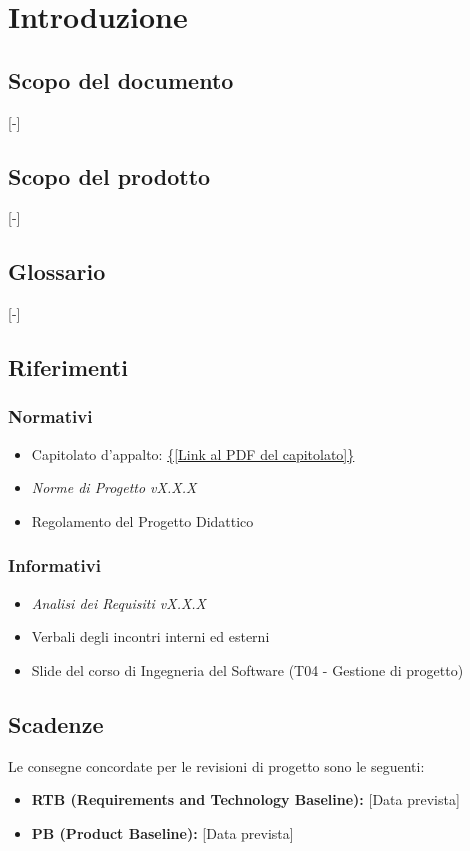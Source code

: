 \section{Introduzione}

\subsection{Scopo del documento}
[-]

\subsection{Scopo del prodotto}
[-]

\subsection{Glossario}
[-]

\subsection{Riferimenti}
\subsubsection{Normativi}
\begin{itemize}
	\item Capitolato d'appalto: \url{{[Link al PDF del capitolato]}}
	\item \textit{Norme di Progetto vX.X.X}
	\item Regolamento del Progetto Didattico
\end{itemize}

\subsubsection{Informativi}
\begin{itemize}
	\item \textit{Analisi dei Requisiti vX.X.X}
	\item Verbali degli incontri interni ed esterni
	\item Slide del corso di Ingegneria del Software (T04 - Gestione di progetto)
\end{itemize}

\subsection{Scadenze}
Le consegne concordate per le revisioni di progetto sono le seguenti:
\begin{itemize}
	\item \textbf{RTB (Requirements and Technology Baseline):} {[Data prevista]}
	\item \textbf{PB (Product Baseline):} {[Data prevista]}
\end{itemize}
